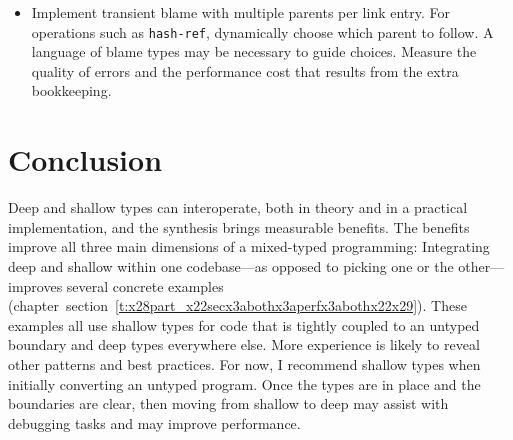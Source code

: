 \documentclass[ twoside,open=right,titlepage,numbers=noenddot,headinclude,%
                footinclude=true,cleardoublepage=empty,abstract=off,
                BCOR=5mm,paper=a4,fontsize=11pt,%
                ngerman,american,%
                parts,pdfspacing]{scrreprt}
\newcommand{\sectionNewpage}{}
\newcommand{\SecRef}[2]{section~#1}
\newcommand{\SecRefLocal}[3]{\hyperref[#1]{\SecRef{#2}{#3}}}
\newcommand{\Scribtexttt}[1]{{\texttt{#1}}}
\let\SOriginalthesubsection\thesubsection
\newcommand{\Ssection}[2]{\section[#1]{#2}\let\thesubsection\SOriginalthesubsection}
\renewcommand{\Ssection}[2]{\chapter[#1]{#2}}
\renewcommand{\SecRefLocal}[3]{section~\ref{#1}}
\begin{document}
\begin{itemize}
\item Implement transient blame with multiple parents per link entry.
For operations such as \Scribtexttt{hash{-}ref}, dynamically choose which parent
 to follow.
A language of blame types may be necessary to guide choices.
Measure the quality of errors and the performance cost that results from the
 extra bookkeeping.\end{itemize}

\sectionNewpage

\Ssection{Conclusion}{Conclusion}\label{t:x28part_x22chapx3aconclusionx22x29}

Deep and shallow types can interoperate,
 both in theory and in a practical implementation, and the synthesis brings
 measurable benefits.
The benefits improve all three main dimensions of a mixed{-}typed programming:
\noindent{}Integrating deep and shallow within one codebase{---}as
 opposed to picking one or the other{---}improves several concrete examples (chapter~\SecRefLocal{t:x28part_x22secx3abothx3aperfx3abothx22x29}{6.3.2.2}{Case Studies: Deep and Shallow}).
These examples all use shallow types for code that is tightly coupled to
 an untyped boundary and deep types everywhere else.
More experience is likely to reveal other patterns and best practices.
For now, I recommend shallow types when initially converting an untyped
 program.
Once the types are in place and the boundaries are clear,
 then moving from shallow to deep may assist with debugging tasks
 and may improve performance.
\end{document}

